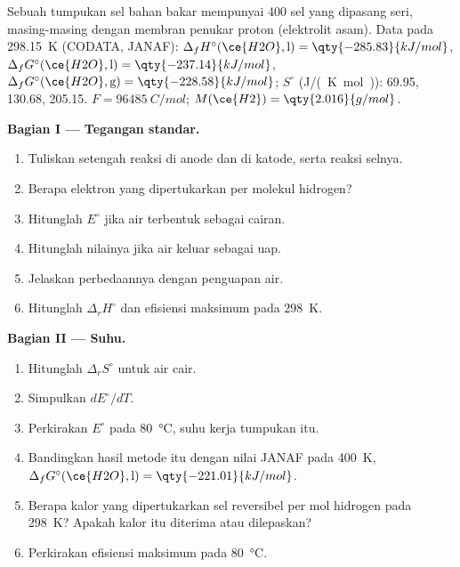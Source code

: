 \begin{problem}
\label{pb:b2:cell-thermodynamics:1}
Sebuah tumpukan sel bahan bakar mempunyai 400 sel yang dipasang seri,
masing-masing dengan membran penukar proton (elektrolit asam). Data pada
\qty{298.15}{K} (CODATA, JANAF): $\Delta_f H^\circ(\ce{H2O}, \text{l}) = \qty{-285.83}{kJ/mol}$, $\Delta_f
G^\circ(\ce{H2O}, \text{l}) = \qty{-237.14}{kJ/mol}$, $\Delta_f G^\circ(\ce{H2O},
\text{g}) = \qty{-228.58}{kJ/mol}$; $S^\circ$ (\unit{J/(K.mol)}):  69.95,
 130.68,  205.15. $F = \qty{96485}{C/mol}$;
$M(\ce{H2}) =
\qty{2.016}{g/mol}$.

\medskip
\noindent\textbf{Bagian I --- Tegangan standar.}
\begin{enumerate}
  \item Tuliskan setengah reaksi di anode dan di katode, serta reaksi
        selnya.
  \item Berapa elektron yang dipertukarkan per molekul hidrogen?
  \item Hitunglah $E^\circ$ jika air terbentuk sebagai cairan.
  \item Hitunglah nilainya jika air keluar sebagai uap.
  \item Jelaskan perbedaannya dengan  penguapan air.
  \item Hitunglah $\Delta_r H^\circ$ dan efisiensi maksimum pada
        \qty{298}{K}.
\end{enumerate}

\medskip
\noindent\textbf{Bagian II --- Suhu.}
\begin{enumerate}[resume]
  \item Hitunglah $\Delta_r S^\circ$ untuk air cair.
  \item Simpulkan $dE^\circ/dT$.
  \item Perkirakan $E^\circ$ pada \qty{80}{\degreeCelsius}, suhu kerja
        tumpukan itu.
  \item Bandingkan hasil metode itu dengan nilai JANAF pada \qty{400}{K},
        $\Delta_f
        G^\circ(\ce{H2O}, \text{l}) = \qty{-221.01}{kJ/mol}$.
  \item Berapa kalor yang dipertukarkan sel reversibel per mol hidrogen
        pada \qty{298}{K}? Apakah kalor itu diterima atau dilepaskan?
  \item Perkirakan efisiensi maksimum pada \qty{80}{\degreeCelsius}.
\end{enumerate}


\end{problem}
